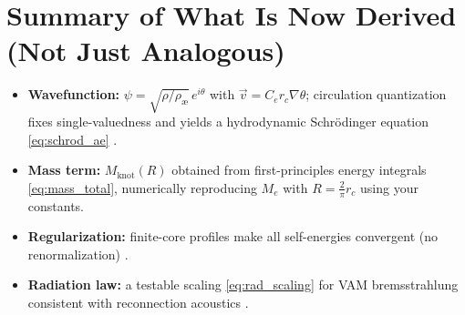 \documentclass[a4paper,12pt]{article}
\begin{document}
    \section{Summary of What Is Now Derived (Not Just Analogous)}
    \begin{itemize}
        \item \textbf{Wavefunction:} $\psi=\sqrt{\rho/\rho_\text{\ae}}\,e^{i\theta}$ with $\vec v=C_e r_c \nabla\theta$; circulation quantization fixes single-valuedness and yields a hydrodynamic Schrödinger equation \eqref{eq:schrod_ae} \cite{Madelung1927,Onsager1949,Feynman1955}.
        \item \textbf{Mass term:} $M_\text{knot}(R)$ obtained from first-principles energy integrals \eqref{eq:mass_total}, numerically reproducing $M_e$ with $R=\frac{2}{\pi}r_c$ using your constants.
        \item \textbf{Regularization:} finite-core profiles make all self-energies convergent (no renormalization) \cite{Saffman1992,Batchelor1967}.
        \item \textbf{Radiation law:} a testable scaling \eqref{eq:rad_scaling} for VAM bremsstrahlung consistent with reconnection acoustics \cite{Leadbeater2001,Zuccher2012,Barenghi2014}.
    \end{itemize}
\end{document}
